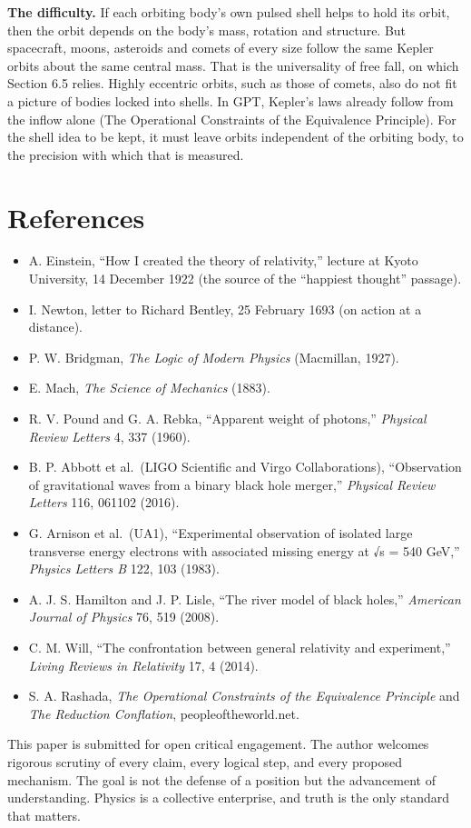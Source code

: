 \documentclass[11pt]{article}
\providecommand{\tightlist}{\setlength{\itemsep}{0pt}\setlength{\parskip}{0pt}}
\begin{document}
\textbf{The difficulty.} If each orbiting body's own pulsed shell helps to hold its orbit, then the orbit depends on the body's mass, rotation and structure. But spacecraft, moons, asteroids and comets of every size follow the same Kepler orbits about the same central mass. That is the universality of free fall, on which Section 6.5 relies. Highly eccentric orbits, such as those of comets, also do not fit a picture of bodies locked into shells. In GPT, Kepler's laws already follow from the inflow alone (The Operational Constraints of the Equivalence Principle). For the shell idea to be kept, it must leave orbits independent of the orbiting body, to the precision with which that is measured.

\section{References}

\begin{itemize}
\tightlist
\item
  A. Einstein, ``How I created the theory of relativity,'' lecture at Kyoto University, 14 December 1922 (the source of the ``happiest thought'' passage).
\item
  I. Newton, letter to Richard Bentley, 25 February 1693 (on action at a distance).
\item
  P. W. Bridgman, \emph{The Logic of Modern Physics} (Macmillan, 1927).
\item
  E. Mach, \emph{The Science of Mechanics} (1883).
\item
  R. V. Pound and G. A. Rebka, ``Apparent weight of photons,'' \emph{Physical Review Letters} 4, 337 (1960).
\item
  B. P. Abbott et al.~(LIGO Scientific and Virgo Collaborations), ``Observation of gravitational waves from a binary black hole merger,'' \emph{Physical Review Letters} 116, 061102 (2016).
\item
  G. Arnison et al.~(UA1), ``Experimental observation of isolated large transverse energy electrons with associated missing energy at √s = 540 GeV,'' \emph{Physics Letters B} 122, 103 (1983).
\item
  A. J. S. Hamilton and J. P. Lisle, ``The river model of black holes,'' \emph{American Journal of Physics} 76, 519 (2008).
\item
  C. M. Will, ``The confrontation between general relativity and experiment,'' \emph{Living Reviews in Relativity} 17, 4 (2014).
\item
  S. A. Rashada, \emph{The Operational Constraints of the Equivalence Principle} and \emph{The Reduction Conflation}, peopleoftheworld.net.
\end{itemize}

This paper is submitted for open critical engagement. The author welcomes rigorous scrutiny of every claim, every logical step, and every proposed mechanism. The goal is not the defense of a position but the advancement of understanding. Physics is a collective enterprise, and truth is the only standard that matters.
\end{document}
